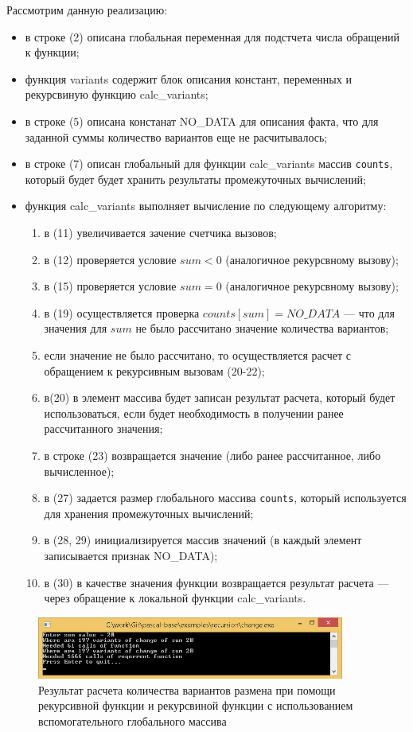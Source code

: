 \documentclass[12pt,a4paper]{article}
\begin{document}
Рассмотрим данную реализацию:
\begin{itemize}
	\item в строке (2) описана глобальная переменная для подстчета числа обращений к функции;
	\item функция variants содержит блок описания констант, переменных и рекурсвиную функцию calc\_variants;
	\item в строке (5) описана констанат NO\_DATA для описания факта, что для заданной суммы количество вариантов еще не расчитывалось;
	\item в строке (7) описан глобальный для функции  calc\_variants массив \texttt{counts}, который будет будет хранить результаты промежуточных вычислений;
	\item функция calc\_variants выполняет вычисление по следующему алгоритму:
	\begin{enumerate}
		\item в (11) увеличивается зачение счетчика вызовов;
		\item в (12) проверяется условие $sum<0$ (аналогичное рекурсвному вызову);
		\item в (15) проверяется условие $sum=0$ (аналогичное рекурсвному вызову);	
		\item в (19) осуществляется проверка $counts[sum] = NO\_DATA$ --- что для значения для $sum$ не было рассчитано значение количества вариантов;
		\item если значение не было рассчитано, то осуществляется расчет с обращением к рекурсивным вызовам (20-22);
		\item в(20) в элемент массива будет записан результат расчета, который будет использоваться, если будет необходимость в получении ранее рассчитанного значения;
		\item в строке (23) возвращается значение (либо ранее рассчитанное, либо вычисленное);
		\item в (27) задается размер глобального массива \texttt{counts}, который используется для хранения промежуточных вычислений;
		\item в (28, 29) инициализируется массив значений (в каждый элемент записывается признак NO\_DATA); 
		\item в (30) в качестве значения функции возвращается результат расчета --- через обращение к локальной функции  calc\_variants.
	\end{enumerate}
\end{itemize}

\begin{figure}[h!]
	\centering	
	\includegraphics[width=0.9\textwidth]{images/lec14-pic05.png}
	\caption{Результат расчета количества вариантов размена при помощи рекурсивной функции и рекурсвиной функции с использованием вспомогательного глобального массива}
	\label{pic05}	
\end{figure}
\end{document}
